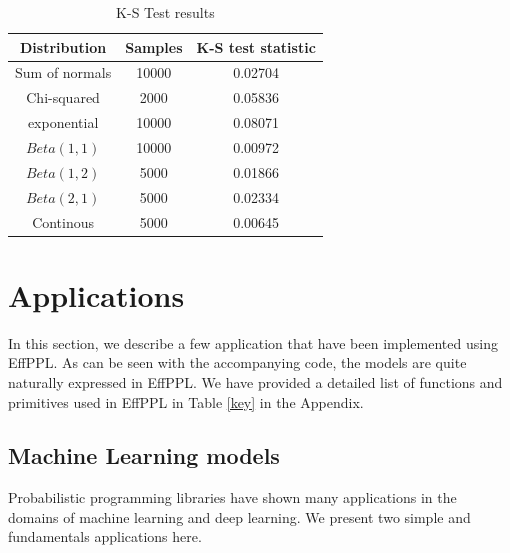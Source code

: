 \documentclass[a4paper,11pt]{article}
\theoremstyle{mytheor}
\begin{document}
\begin{table}[H]
	\centering
    \caption{K-S Test results}
	\begin{tabular}{|c|c|c|}
		\toprule
		Distribution   & {Samples} & {K-S test statistic} \\
		\midrule
		\midrule
	
        Sum of normals & 10000                       & 0.02704                               \\
        Chi-squared    & 2000                        & 0.05836                               \\
        exponential    & 10000                       & 0.08071                               \\
        $Beta(1,1)$      & 10000                       & 0.00972                               \\
        $Beta(1,2)$     & 5000                        & 0.01866                               \\
        $Beta(2,1)$      & 5000                        & 0.02334                               \\
        Continous      & 5000                        & 0.00645            \\          
		\bottomrule
	\end{tabular}
	\label{kstests}
\end{table}
    
\section{Applications}
    \label{sec:app}
    In this section, we describe a few application that have been implemented using EffPPL. As can be seen with the accompanying code, the models are quite naturally expressed in EffPPL. We have provided a detailed list of functions and primitives used in EffPPL in Table \ref{key} in the Appendix. 
    \subsection{Machine Learning models}
        Probabilistic programming libraries have shown many applications in the domains of machine learning and deep learning. We present two simple and fundamentals applications here.
\end{document}
